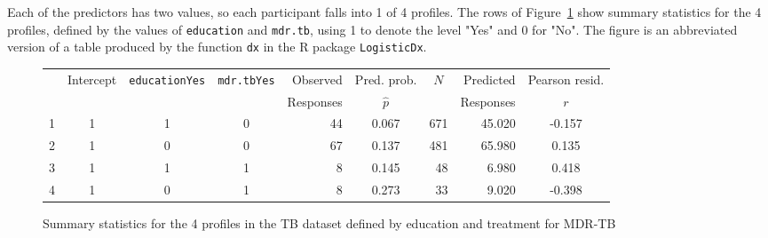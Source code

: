 Each of the predictors has two values, so each participant falls into 1 of 4 profiles.  The rows of Figure~\ref{figure:tbInterruptProfiles} show summary statistics for the 4 profiles, defined by the values of \texttt{education} and \texttt{mdr.tb}, using 1 to denote the level "Yes" and 0 for "No".  The figure is an abbreviated version of a table produced by the function \texttt{dx} in the \textsf{R} package \texttt{LogisticDx}.

\begin{figure}[ht]
\centering
\begin{tabular}{rrrrrrrrr}
  \hline
 & Intercept & \texttt{educationYes} & \texttt{mdr.tbYes} & Observed & Pred. prob.  &
 \multicolumn{1}{c}{$N$} & Predicted & Pearson resid. \\
 & & & & Responses & \multicolumn{1}{c}{$\hat{p}$} & & Responses & \multicolumn{1}{c}{$r$} \\
  \hline
1 & \multicolumn{1}{c}{1} & \multicolumn{1}{c}{1} & \multicolumn{1}{c}{0} &
 44 & \multicolumn{1}{c}{0.067} & 671 & 45.020 & \multicolumn{1}{c}{-0.157} \\
  2 & \multicolumn{1}{c}{1} & \multicolumn{1}{c}{0} & \multicolumn{1}{c}{0}
  & 67 & \multicolumn{1}{c}{0.137} & 481 & 65.980 & \multicolumn{1}{c}{0.135} \\
  3 & \multicolumn{1}{c}{1} & \multicolumn{1}{c}{1} & \multicolumn{1}{c}{1}
  & 8 & \multicolumn{1}{c}{0.145} & 48 & 6.980 & \multicolumn{1}{c}{0.418} \\
  4 & \multicolumn{1}{c}{1} & \multicolumn{1}{c}{0} & \multicolumn{1}{c}{1}
  & 8 & \multicolumn{1}{c}{0.273} & 33 & 9.020 & \multicolumn{1}{c}{-0.398} \\
   \hline
\end{tabular}
\caption{Summary statistics for the 4 profiles in the TB dataset
       defined by education and treatment for MDR-TB}
\label{figure:tbInterruptProfiles}
\end{figure}

